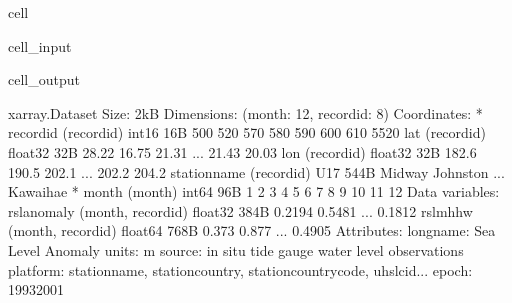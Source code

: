 \documentclass[letterpaper,10pt,english]{jupyterBook}
\begin{document}
\begin{sphinxuseclass}{cell}\begin{sphinxVerbatimInput}

\begin{sphinxuseclass}{cell_input}
\begin{sphinxVerbatim}[commandchars=\\\{\}]
  
  

\end{sphinxVerbatim}

\end{sphinxuseclass}\end{sphinxVerbatimInput}
\begin{sphinxVerbatimOutput}

\begin{sphinxuseclass}{cell_output}
\begin{sphinxVerbatim}[commandchars=\\\{\}]
\PYGZlt{}xarray.Dataset\PYGZgt{} Size: 2kB
Dimensions:       (month: 12, record\PYGZus{}id: 8)
Coordinates:
  * record\PYGZus{}id     (record\PYGZus{}id) int16 16B 500 520 570 580 590 600 610 5520
    lat           (record\PYGZus{}id) float32 32B 28.22 16.75 21.31 ... 21.43 20.03
    lon           (record\PYGZus{}id) float32 32B 182.6 190.5 202.1 ... 202.2 204.2
    station\PYGZus{}name  (record\PYGZus{}id) \PYGZlt{}U17 544B \PYGZsq{}Midway\PYGZsq{} \PYGZsq{}Johnston\PYGZsq{} ... \PYGZsq{}Kawaihae\PYGZsq{}
  * month         (month) int64 96B 1 2 3 4 5 6 7 8 9 10 11 12
Data variables:
    rsl\PYGZus{}anomaly   (month, record\PYGZus{}id) float32 384B \PYGZhy{}0.2194 \PYGZhy{}0.5481 ... \PYGZhy{}0.1812
    rsl\PYGZus{}mhhw      (month, record\PYGZus{}id) float64 768B \PYGZhy{}0.373 \PYGZhy{}0.877 ... \PYGZhy{}0.4905
Attributes:
    long\PYGZus{}name:  Sea Level Anomaly
    units:      m
    source:     in situ tide gauge water level observations
    platform:   station\PYGZus{}name, station\PYGZus{}country, station\PYGZus{}country\PYGZus{}code, uhslc\PYGZus{}id...
    epoch:      1993\PYGZhy{}2001
\end{sphinxVerbatim}

\end{sphinxuseclass}\end{sphinxVerbatimOutput}

\end{sphinxuseclass}
\end{document}
